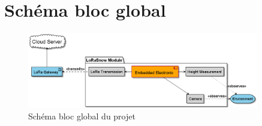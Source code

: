 \section{Schéma bloc global}

\begin{figure}[H]
    \centering
    \includegraphics[width=0.9\textwidth]{Diagram/out/BlockDiagram/GlobalBlockDiagram.png}
    \caption{Schéma bloc global du projet}
    \label{fig:GlobalBlockDiagram}
\end{figure}


